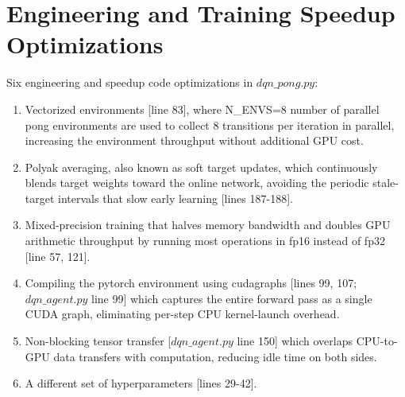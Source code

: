 \section{Engineering and Training Speedup Optimizations}
\label{sec:dqn-optimizations}
Six engineering and speedup code optimizations in $\hyperref[code:dqn_dqn_pong]{dqn\_pong.py}$:
\begin{enumerate}
\item Vectorized environments [line 83], where N\_ENVS=8 number of parallel pong environments are used to collect 8 transitions per iteration in parallel, increasing the environment throughput without additional GPU cost. 
\item Polyak averaging, also known as soft target updates, which continuously blends target weights toward the online network, avoiding the periodic stale-target intervals that slow early learning [lines 187-188]. 
\item Mixed-precision training that halves memory bandwidth and doubles GPU arithmetic throughput by running most operations in fp16 instead of fp32 [line 57, 121]. 
\item Compiling the pytorch environment using cudagraphs [lines 99, 107; $\hyperref[code:dqn_core_dqn_agent]{dqn\_agent.py}$ line 99] which captures the entire forward pass as a single CUDA graph, eliminating per-step CPU kernel-launch overhead. 
\item Non-blocking tensor transfer [$\hyperref[code:dqn_core_dqn_agent]{dqn\_agent.py}$ line 150] which overlaps CPU-to-GPU data transfers with computation, reducing idle time on both sides. 
\item A different set of hyperparameters [lines 29-42].
\end{enumerate}